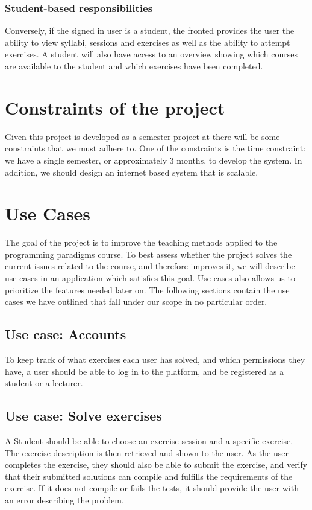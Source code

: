 \subsubsection*{Student-based responsibilities}
Conversely, if the signed in user is a student, the fronted provides the user the ability to view syllabi, sessions and exercises as well as the ability to attempt exercises. A student will also have access to an overview showing which courses are available to the student and which exercises have been completed. 


\section*{Constraints of the project}
Given this project is developed as a semester project at \aau{} there will be some constraints that we must adhere to. 
One of the constraints is the time constraint: we have a single semester, or approximately 3 months, to develop the system. 
In addition, we should design an internet based system that is scalable. 
 
\section*{Use Cases} \label{sec:use_cases}
The goal of the project is to improve the teaching methods applied to the programming paradigms course. 
To best assess whether the project solves the current issues related to the course, and therefore improves it, we will describe use cases in an application which satisfies this goal.
Use cases also allows us to prioritize the features needed later on.
The following sections contain the use cases we have outlined that fall under our scope in no particular order.  

\subsection*{Use case: Accounts}
To keep track of what exercises each user has solved, and which permissions they have, a user should be able to log in to the platform, and be registered as a student or a lecturer.

\subsection*{Use case: Solve exercises}
A Student should be able to choose an exercise session and a specific exercise. The exercise description is then retrieved and shown to the user.
As the user completes the exercise, they should also be able to submit the exercise, and verify that their submitted solutions can compile and fulfills the requirements of the exercise. If it does not compile or fails the tests, it should provide the user with an error describing the problem. 

